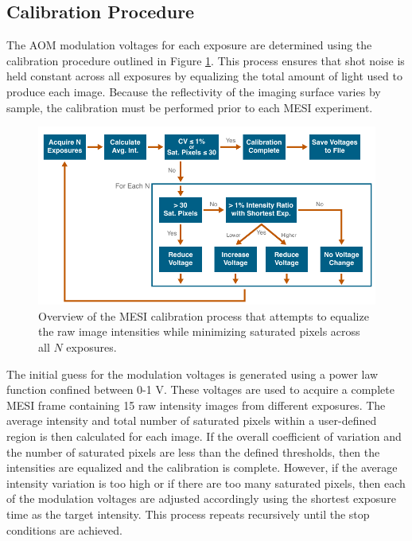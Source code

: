 \subsection{Calibration Procedure}

The AOM modulation voltages for each exposure are determined using the calibration procedure outlined in Figure \ref{fig:mesicalibration}. This process ensures that shot noise is held constant across all exposures by equalizing the total amount of light used to produce each image. Because the reflectivity of the imaging surface varies by sample, the calibration must be performed prior to each MESI experiment.

\begin{figure}
    \includegraphics{figures/chapter_4/mesicalibration.pdf}
    \caption{
        \label{fig:mesicalibration}
        Overview of the MESI calibration process that attempts to equalize the raw image intensities while minimizing saturated pixels across all $N$ exposures.
    }
\end{figure}

The initial guess for the modulation voltages is generated using a power law function confined between 0-1 V. These voltages are used to acquire a complete MESI frame containing 15 raw intensity images from different exposures. The average intensity and total number of saturated pixels within a user-defined region is then calculated for each image. If the overall coefficient of variation and the number of saturated pixels are less than the defined thresholds, then the intensities are equalized and the calibration is complete. However, if the average intensity variation is too high or if there are too many saturated pixels, then each of the modulation voltages are adjusted accordingly using the shortest exposure time as the target intensity. This process repeats recursively until the stop conditions are achieved.

